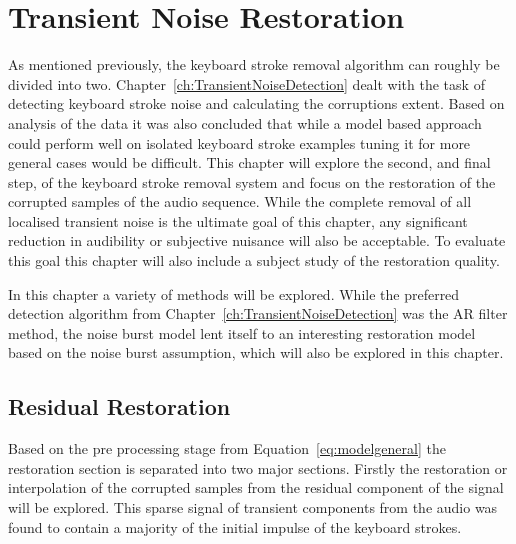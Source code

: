 \chapter{Transient Noise Restoration}\label{ch:TransientNoiseRestoration}

\ifpdf
    \graphicspath{{Chapter6_TransNoiseRest/Chapter6Figs/PNG/}{Chapter6_TransNoiseRest/Chapter6Figs/PDF/}{Chapter6_TransNoiseRest/Chapter6Figs/}{Chapter6_TransNoiseRest/Chapter6Figs/Subjective/}{Chapter6_TransNoiseRest/Chapter6Figs/Results/}{Chapter6_TransNoiseRest/Chapter6Figs/waveformResultsFinalHello123/}}
\else
    \graphicspath{{Chapter6_TransNoiseRest/Chapter6Figs/EPS/}{Chapter6_TransNoiseRest/Chapter6Figs/}}
\fi

As mentioned previously, the keyboard stroke removal algorithm can roughly be divided into two. Chapter~\ref{ch:TransientNoiseDetection} dealt with the task of detecting keyboard stroke noise and calculating the corruptions extent. Based on analysis of the data it was also concluded that while a model based approach could perform well on isolated keyboard stroke examples tuning it for more general cases would be difficult. This chapter will explore the second, and final step, of the keyboard stroke removal system and focus on the restoration of the corrupted samples of the audio sequence. While the complete removal of all localised transient noise is the ultimate goal of this chapter, any significant reduction in audibility or subjective nuisance will also be acceptable. To evaluate this goal this chapter will also include a subject study of the restoration quality.

In this chapter a variety of methods will be explored. While the preferred detection algorithm from Chapter~\ref{ch:TransientNoiseDetection} was the AR filter method, the noise burst model lent itself to an interesting restoration model based on the noise burst assumption, which will also be explored in this chapter.


\section{Residual Restoration}
Based on the pre processing stage from Equation~\ref{eq:modelgeneral} the restoration section is separated into two major sections. Firstly the restoration or interpolation of the corrupted samples from the residual component of the signal will be explored. This sparse signal of transient components from the audio was found to contain a majority of the initial impulse of the keyboard strokes.

